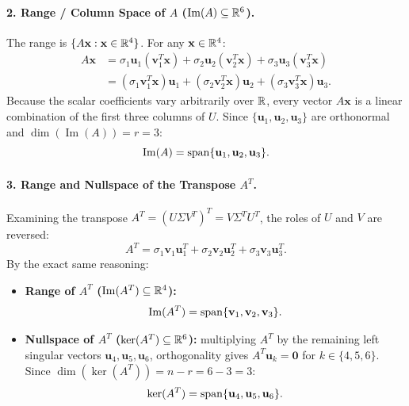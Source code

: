\paragraph{2. Range / Column Space of $A$ ($\operatorname{Im}(A) \subseteq \mathbb{R}^6$).}
The range is $\{A\mathbf{x} : \mathbf{x} \in \mathbb{R}^4\}$. For any $\mathbf{x} \in \mathbb{R}^4$:
\begin{align}
    A\mathbf{x} &= \sigma_1 \mathbf{u}_1 (\mathbf{v}_1^T \mathbf{x}) + \sigma_2 \mathbf{u}_2 (\mathbf{v}_2^T \mathbf{x}) + \sigma_3 \mathbf{u}_3 (\mathbf{v}_3^T \mathbf{x}) \nonumber \\
                &= (\sigma_1 \mathbf{v}_1^T \mathbf{x}) \mathbf{u}_1 + (\sigma_2 \mathbf{v}_2^T \mathbf{x}) \mathbf{u}_2 + (\sigma_3 \mathbf{v}_3^T \mathbf{x}) \mathbf{u}_3.
\end{align}
Because the scalar coefficients vary arbitrarily over $\mathbb{R}$, every vector $A\mathbf{x}$ is a linear combination of the first three columns of $U$. Since $\{\mathbf{u}_1, \mathbf{u}_2, \mathbf{u}_3\}$ are orthonormal and $\dim(\operatorname{Im}(A)) = r = 3$:
\begin{equation}
    \operatorname{Im}(A) = \operatorname{span}\{\mathbf{u}_1, \mathbf{u}_2, \mathbf{u}_3\}.
\end{equation}

\paragraph{3. Range and Nullspace of the Transpose $A^T$.}
Examining the transpose $A^T = (U \Sigma V^T)^T = V \Sigma^T U^T$, the roles of $U$ and $V$ are reversed:
\begin{equation}
    A^T = \sigma_1 \mathbf{v}_1 \mathbf{u}_1^T + \sigma_2 \mathbf{v}_2 \mathbf{u}_2^T + \sigma_3 \mathbf{v}_3 \mathbf{u}_3^T.
\end{equation}
By the exact same reasoning:
\begin{itemize}
    \item \textbf{Range of $A^T$ ($\operatorname{Im}(A^T) \subseteq \mathbb{R}^4$):}
    \begin{equation}
        \operatorname{Im}(A^T) = \operatorname{span}\{\mathbf{v}_1, \mathbf{v}_2, \mathbf{v}_3\}.
    \end{equation}
    \item \textbf{Nullspace of $A^T$ ($\ker(A^T) \subseteq \mathbb{R}^6$):}
    multiplying $A^T$ by the remaining left singular vectors $\mathbf{u}_4, \mathbf{u}_5, \mathbf{u}_6$, orthogonality gives $A^T \mathbf{u}_k = \mathbf{0}$ for $k \in \{4, 5, 6\}$. Since $\dim(\ker(A^T)) = n - r = 6 - 3 = 3$:
    \begin{equation}
        \ker(A^T) = \operatorname{span}\{\mathbf{u}_4, \mathbf{u}_5, \mathbf{u}_6\}.
    \end{equation}
\end{itemize}

